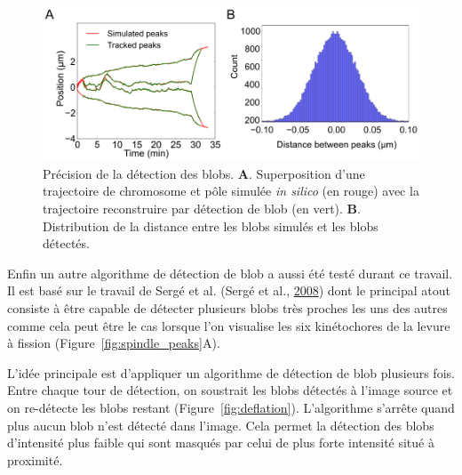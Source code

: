 \documentclass[12pt,a4paper,twoside,openright]{book}
\begin{document}
\begin{figure}[htbp]
\centering
\includegraphics{figures/results/imaging/detection_precision.png}
\caption{\label{fig:detection_precision}Précision de la détection des
blobs. \textbf{A}. Superposition d'une trajectoire de chromosome et pôle
simulée \emph{in silico} (en rouge) avec la trajectoire reconstruire par
détection de blob (en vert). \textbf{B}. Distribution de la distance
entre les blobs simulés et les blobs détectés.}
\end{figure}

Enfin un autre algorithme de détection de blob a aussi été testé durant
ce travail. Il est basé sur le travail de Sergé et al. (Sergé et al.,
\protect\hyperlink{ref-Serge2008}{2008}) dont le principal atout
consiste à être capable de détecter plusieurs blobs très proches les uns
des autres comme cela peut être le cas lorsque l'on visualise les six
kinétochores de la levure à fission (Figure~\ref{fig:spindle_peaks}A).

L'idée principale est d'appliquer un algorithme de détection de blob
plusieurs fois. Entre chaque tour de détection, on soustrait les blobs
détectés à l'image source et on re-détecte les blobs restant
(Figure~\ref{fig:deflation}). L'algorithme s'arrête quand plus aucun
blob n'est détecté dans l'image. Cela permet la détection des blobs
d'intensité plus faible qui sont masqués par celui de plus forte
intensité situé à proximité.
\end{document}
